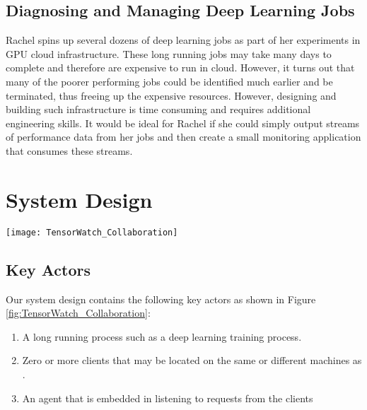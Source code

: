 \documentclass[sigchi]{acmart}
\begin{document}
\subsection{Diagnosing and Managing Deep Learning Jobs}
Rachel spins up several dozens of deep learning jobs as part of her experiments in GPU cloud infrastructure. These long running jobs may take many days to complete and therefore are expensive to run in cloud. However, it turns out that many of the poorer performing jobs could be identified much earlier and be terminated, thus freeing up the expensive resources. However, designing and building such infrastructure is time consuming and requires additional engineering skills. It would be ideal for Rachel if she could simply output streams of performance data from her jobs and then create a small monitoring application that consumes these streams.

\section{System Design}

\begin{figure*}[ht]
  \centering
  \texttt{[image: TensorWatch\_Collaboration]}
  \caption{Collaboration diagram for our system depicting interactions between various actors. Standard notations are used with numbered interactions indicating their sequence with alphabet suffix denoting the potential concurrency. Our system includes the long running process generating various events, clients making requests for stream using map-reduce queries (denoted by MRx) for the desired events and the agent responding back with resultant streams that can be directed to desired visualizations or other processes.}
  \label{fig:TensorWatch_Collaboration}
\end{figure*}

\subsection{Key Actors}
Our system design contains the following key actors as shown in Figure \ref{fig:TensorWatch_Collaboration}:
\begin{enumerate}
  \item A long running process  such as a deep learning training process.
  \item Zero or more clients that may be located on the  same or different machines as .
  \item An agent  that is embedded in  listening to requests from the clients
\end{enumerate}
\end{document}
